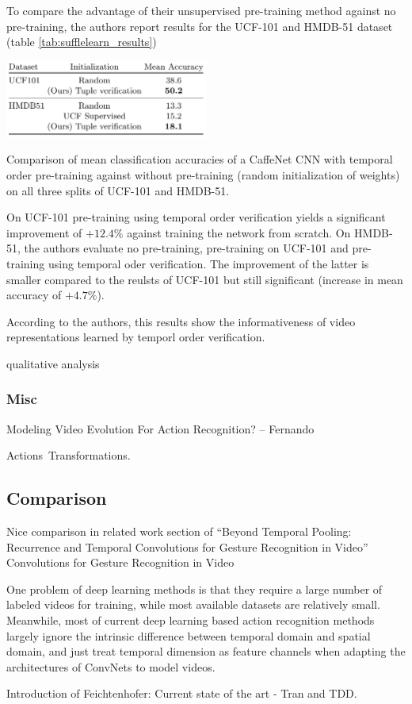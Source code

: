 To compare the advantage of their unsupervised pre-training method against no pre-training, the authors report results for the UCF-101 and HMDB-51 dataset (table \ref{tab:sufflelearn_results})

\begin{table}[H]
    \centering
    \includegraphics[width=0.5\textwidth]{img_deep/shufflelearn_results}
    \caption{Comparison of mean classification accuracies of a CaffeNet CNN with temporal order pre-training against without pre-training (random initialization of weights) on all three splits of UCF-101 and HMDB-51. \cite{misra_shuffle_2016}}
    \label{tab:shufflelearn_results}
\end{table}

On UCF-101 pre-training using temporal order verification yields a significant improvement of $+12.4\%$ against training the network from scratch.
On HMDB-51, the authors evaluate no pre-training, pre-training on UCF-101 and pre-training using temporal oder verification. The improvement of the latter is smaller compared to the reulsts of UCF-101 but still significant (increase in mean accuracy of $+4.7\%$).

According to the authors, this results show the informativeness of video representations learned by temporl order verification.

qualitative analysis

\subsubsection{Misc}
Modeling Video Evolution For Action Recognition? -- Fernando

Actions~Transformations.

\subsection{Comparison}
Nice comparison in related work section of ``Beyond Temporal Pooling:  Recurrence and Temporal Convolutions for Gesture Recognition in Video''
Convolutions for Gesture Recognition in Video

One problem of deep learning methods is that they require a large number of labeled videos for training, while most available datasets are relatively small.
Meanwhile, most of current deep learning based action recognition methods largely ignore the intrinsic difference between temporal domain and spatial domain, and just treat temporal dimension as feature channels when adapting the architectures of ConvNets to model videos.

Introduction of Feichtenhofer: Current state of the art - Tran and TDD.
